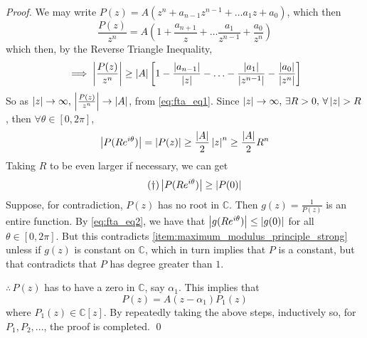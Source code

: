 \documentclass[11pt, oneside]{book}
\begin{document}
\begin{enumerate}
 	\begin{proof}
 		We may write $P(z) = A(z^n + a_{n - 1} z^{n - 1} + \hdots a_1 z + a_0)$, which then
 		\begin{equation*}
 			\frac{P(z)}{z^n} = A \left(1 + \frac{a_{n + 1}}{z} + \hdots \frac{a_1}{z^{n-1}} + \frac{a_0}{z^n} \right)
 		\end{equation*}
 		which then, by the Reverse Triangle Inequality,
 		\begin{equation}\label{eq:fta_eq1}
 			\implies \left|\frac{P(z)}{z^n} \right| \geq \left|A\right| \left[1 - \frac{\left|a_{n - 1}\right|}{\left|z\right|} - \hdots - \frac{\left|a_1\right|}{\left|z^{n - 1}\right|} - \frac{\left|a_0\right|}{\left|z^n\right|} \right]
 		\end{equation}
 		So as $\left|z\right| \to \infty, \, \left|\frac{P(z)}{z^n} \right| \to \left|A\right|$, from \cref{eq:fta_eq1}. Since $\left|z\right| \to \infty, \, \exists R > 0, \, \forall \left|z\right| > R$, then $\forall \theta \in [0, 2 \pi]$,
 		\begin{equation*}
 			\left|P(Re^{i \theta})\right| = \left|P(z)\right| \geq \frac{\left|A\right|}{2} \left|z\right|^n \geq \frac{\left|A\right|}{2} R^n 
 		\end{equation*}
 		Taking $R$ to be even larger if necessary, we can get
 		\begin{equation}\tag{$\dagger$}\label{eq:fta_eq2}
 			\left|{P(Re^{i \theta})}\right| \geq \left|P(0)\right|
 		\end{equation}
 		Suppose, for contradiction, $P(z)$ has no root in $\mathbb{C}$. Then $g(z) = \frac{1}{P(z)}$ is an entire function. By \cref{eq:fta_eq2}, we have that $\left|g(Re^{i \theta})\right| \leq \left|g(0)\right|$ for all $\theta \in [0, 2 \pi]$. But this contradicts \cref{item:maximum_modulus_principle_strong} unless if $g(z)$ is constant on $\mathbb{C}$, which in turn implies that $P$ is a constant, but that contradicts that $P$ has degree greater than $1$.

 		$\therefore \, P(z)$ has to have a zero in $\mathbb{C}$, say $\alpha_1$. This implies that
 		\begin{equation*}
 			P(z) = A (z - \alpha_1) P_1 (z)
 		\end{equation*}
 		where $P_1(z) \in \mathbb{C} [z]$. By repeatedly taking the above steps, inductively so, for $P_1, P_2, ...$, the proof is completed. \qed
 	\end{proof}
\end{enumerate}


\end{document}
